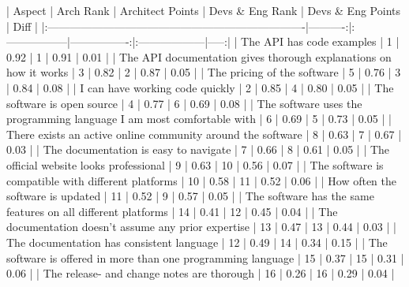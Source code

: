 \documentclass[11pt]{article}
\begin{document}
\begin{multicols}{2}
    |                                Aspect                                 | Arch Rank | Architect Points | Devs & Eng Rank | Devs & Eng Points | Diff |
    |:----------------------------------------------------------------------|----------:|:-----------------|----------------:|:------------------|-----:|
    | The API has code examples                                             |         1 | 0.92             |               1 | 0.91              | 0.01 |
    | The API documentation gives thorough explanations on how it works     |         3 | 0.82             |               2 | 0.87              | 0.05 |
    | The pricing of the software                                           |         5 | 0.76             |               3 | 0.84              | 0.08 |
    | I can have working code quickly                                       |         2 | 0.85             |               4 | 0.80              | 0.05 |
    | The software is open source                                           |         4 | 0.77             |               6 | 0.69              | 0.08 |
    | The software uses the programming language I am most comfortable with |         6 | 0.69             |               5 | 0.73              | 0.05 |
    | There exists an active online community around the software           |         8 | 0.63             |               7 | 0.67              | 0.03 |
    | The documentation is easy to navigate                                 |         7 | 0.66             |               8 | 0.61              | 0.05 |
    | The official website looks professional                               |         9 | 0.63             |              10 | 0.56              | 0.07 |
    | The software is compatible with different platforms                   |        10 | 0.58             |              11 | 0.52              | 0.06 |
    | How often the software is updated                                     |        11 | 0.52             |               9 | 0.57              | 0.05 |
    | The software has the same features on all different platforms         |        14 | 0.41             |              12 | 0.45              | 0.04 |
    | The documentation doesn't assume any prior expertise                  |        13 | 0.47             |              13 | 0.44              | 0.03 |
    | The documentation has consistent language                             |        12 | 0.49             |              14 | 0.34              | 0.15 |
    | The software is offered in more than one programming language         |        15 | 0.37             |              15 | 0.31              | 0.06 |
    | The release- and change notes are thorough                            |        16 | 0.26             |              16 | 0.29              | 0.04 |



\end{multicols}
\end{document}
